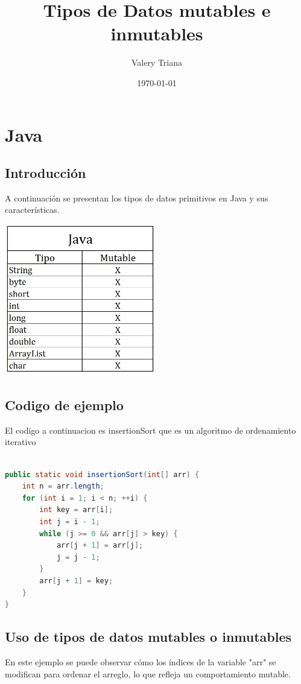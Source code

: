 \documentclass{article}
\title{Tipos de Datos mutables e inmutables}
\author{Valery Triana}
\date{\today} %
\begin{document}
\maketitle

\section{Java}

\subsection{Introducción}
A continuación se presentan los tipos de datos primitivos en Java y sus características.

\includegraphics[width=0.5\textwidth]{javaTabla.jpg} %

\subsection{Codigo de ejemplo}

El codigo a continuacion es insertionSort que es un algoritmo de ordenamiento iterativo

\begin{lstlisting}[language=Java, caption=Ejemplo de código en Java]

public static void insertionSort(int[] arr) {
    int n = arr.length;
    for (int i = 1; i < n; ++i) {
        int key = arr[i];
        int j = i - 1;
        while (j >= 0 && arr[j] > key) {
            arr[j + 1] = arr[j];
            j = j - 1;
        }
        arr[j + 1] = key;
    }
}
\end{lstlisting}
\subsection{Uso de tipos de datos mutables o inmutables}
En este ejemplo se puede observar cómo los índices de la variable "arr" se modifican para ordenar el arreglo, lo que refleja un comportamiento mutable.
\end{document}
